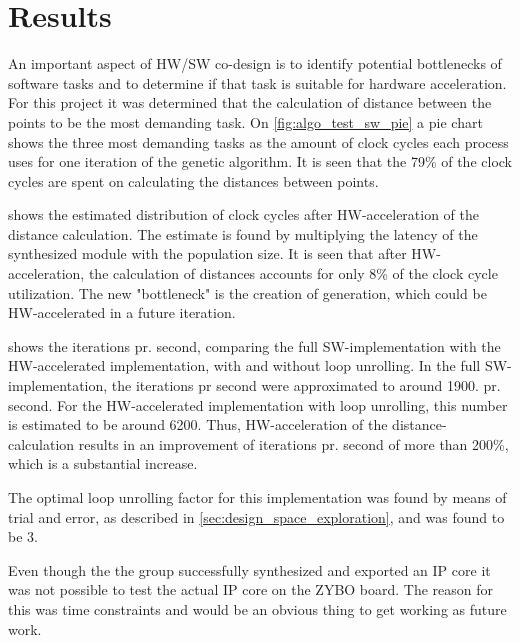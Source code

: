 
\chapter{Results}
An important aspect of HW/SW co-design is to identify potential bottlenecks of software tasks and to determine if that task is suitable for hardware acceleration. For this project it was determined that the calculation of distance between the points to be the most demanding task. On \cref{fig:algo_test_sw_pie} a pie chart shows the three most demanding tasks as the amount of clock cycles each process uses for one iteration of the genetic algorithm. It is seen that the 79\% of the clock cycles are spent on calculating the distances between points.

 shows the estimated distribution of clock cycles after HW-acceleration of the distance calculation. The estimate is found by multiplying the latency of the synthesized module with the population size. It is seen that after HW-acceleration, the calculation of distances accounts for only 8\% of the clock cycle utilization. The new "bottleneck" is the creation of generation, which could be HW-accelerated in a future iteration.

 shows the iterations pr. second, comparing the full SW-implementation with the HW-accelerated implementation, with and without loop unrolling. In the full SW-implementation, the iterations pr second were approximated to around 1900. pr. second. For the HW-accelerated implementation with loop unrolling, this number is estimated to be around 6200. Thus, HW-acceleration of the distance-calculation results in an improvement of iterations pr. second of more than 200\%, which is a substantial increase.

The optimal loop unrolling factor for this implementation was found by means of trial and error, as described in \cref{sec:design_space_exploration}, and was found to be 3.

Even though the the group successfully synthesized and exported an IP core it was not possible to test the actual IP core on the ZYBO board. The reason for this was time constraints and would be an obvious thing to get working as future work.


